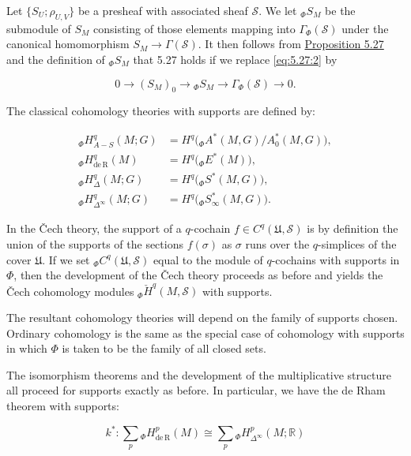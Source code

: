 Let $\{S_U; \rho_{U,V}\}$ be a presheaf with associated sheaf $\mathcal{S}$. We let ${}_{\Phi}S_{M}$ be the submodule of $S_{M}$ consisting of those elements mapping into $\Gamma_{\Phi}(\mathcal{S})$ under the canonical homomorphism $S_{M}\to\Gamma(\mathcal{S})$. It then follows from \hyperref[thm:5.27]{Proposition 5.27} and the definition of ${}_{\Phi}S_{M}$ that 5.27 holds if we replace \eqref{eq:5.27:2} by

\begin{equation}
\tag{2}\label{eq:5.46:2}
0\to(S_{M})_{0}\to{}_{\Phi}S_{M}\to\Gamma_{\Phi}(\mathcal{S})\to0.
\end{equation}

The classical cohomology theories with supports are defined by:

\begin{equation}
\tag{3}\label{eq:5.46:3}
\begin{aligned}{}_{\Phi}H_{A-S}^{q}(M;G)&=H^{q}\big({}_{\Phi}A^{*}(M,G)/A_{0}^{*}(M,G)\big),\\ {}_{\Phi}H_{\mathrm{de\,R}}^{q}(M)&=H^{q}\big({}_{\Phi}E^{*}(M)\big),\\ {}_{\Phi}H_{\Delta}^{q}(M;G)&=H^{q}\big({}_{\Phi}S^{*}(M,G)\big),\\ {}_{\Phi}H_{\Delta^{\infty}}^{q}(M;G)&=H^{q}\big({}_{\Phi}S_{\infty}^{*}(M,G)\big).\end{aligned}
\end{equation}

In the Čech theory, the support of a $q$-cochain $f\in C^{q}(\mathfrak{U},\mathcal{S})$ is by definition the union of the supports of the sections $f(\sigma)$ as $\sigma$ runs over the $q$-simplices of the cover $\mathfrak{U}$. If we set ${}_{\Phi}C^{q}(\mathfrak{U},\mathcal{S})$ equal to the module of $q$-cochains with supports in $\Phi$, then the development of the Čech theory proceeds as before and yields the Čech cohomology modules ${}_{\Phi}\check{H}^{q}(M,\mathcal{S})$ with supports.

The resultant cohomology theories will depend on the family of supports chosen. Ordinary cohomology is the same as the special case of cohomology with supports in which $\Phi$ is taken to be the family of all closed sets.

The isomorphism theorems and the development of the multiplicative structure all proceed for supports exactly as before. In particular, we have the de Rham theorem with supports:

\begin{equation}
\tag{4}\label{eq:5.46:4}
k^{*}\colon\sum_{p}{}_{\Phi}H_{\mathrm{de\,R}}^{p}(M)\cong\sum_{p}{}_{\Phi}H_{\Delta^{\infty}}^{p}(M;\mathbb{R})
\end{equation}

